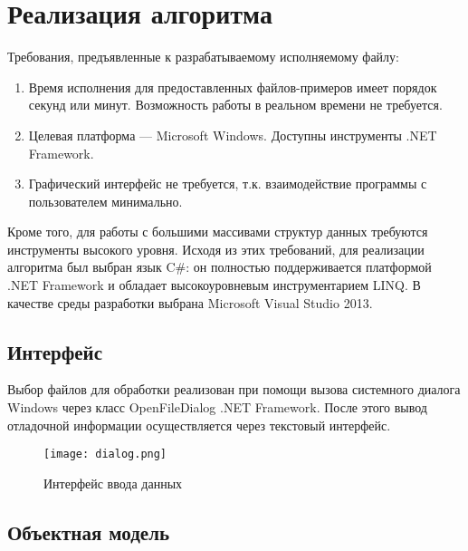 \section{Реализация алгоритма}
\label{}

Требования, предъявленные к разрабатываемому исполняемому файлу:
\begin{enumerate}
\item Время исполнения для предоставленных файлов-примеров имеет порядок секунд или минут. Возможность работы в реальном времени не требуется.
\item Целевая платформа --- Microsoft Windows. Доступны инструменты .NET Framework.
\item Графический интерфейс не требуется, т.к. взаимодействие программы с пользователем минимально.
\end{enumerate}

Кроме того, для работы с большими массивами структур данных требуются инструменты высокого уровня. Исходя из этих требований, для реализации алгоритма был выбран язык C\#: он полностью поддерживается платформой .NET Framework и обладает высокоуровневым инструментарием LINQ. В качестве среды разработки выбрана Microsoft Visual Studio 2013.

\subsection{Интерфейс}
\label{}

Выбор файлов для обработки реализован при помощи вызова системного диалога Windows через класс OpenFileDialog .NET Framework. После этого вывод отладочной информации осуществляется через текстовый интерфейс.

\begin{figure}[!htb]
    \centering
    \texttt{[image: dialog.png]}
    \caption{Интерфейс ввода данных}
    \label{fig:dialog}
\end{figure}

\subsection{Объектная модель}
\label{}

